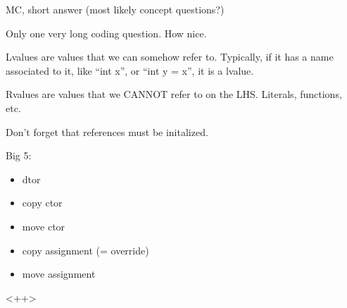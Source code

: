 \documentclass{article}
\author{Clement Tsang}
\begin{document}
\item MC, short answer (most likely concept questions?)
\item Only one very long coding question.  How nice.
\item Lvalues are values that we can somehow refer to.  Typically, if it has a name associated to it, like ``int x'', or ``int y = x'', it is a lvalue.
\item Rvalues are values that we CANNOT refer to on the LHS.  Literals, functions, etc.
\item Don't forget that references must be initalized.
\item Big 5:
\begin{itemize}
\item dtor
\item copy ctor
\item move ctor
\item copy assignment  (= override)
\item move assignment 
\end{itemize}
<++>
\end{document}

